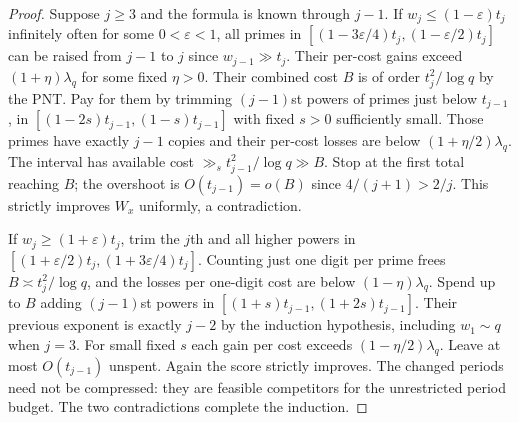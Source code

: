 \begin{proof}
Suppose $j\ge3$ and the formula is known through $j-1$. If $w_j\le(1-\varepsilon)t_j$ infinitely often for some $0<\varepsilon<1$, all primes in $[(1-3\varepsilon/4)t_j,(1-\varepsilon/2)t_j]$ can be raised from $j-1$ to $j$ since $w_{j-1}\gg t_j$. Their per-cost gains exceed $(1+\eta)\lambda_q$ for some fixed $\eta>0$. Their combined cost $B$ is of order $t_j^2/\log q$ by the PNT. Pay for them by trimming $(j-1)$st powers of primes just below $t_{j-1}$, in $[(1-2s)t_{j-1},(1-s)t_{j-1}]$ with fixed $s>0$ sufficiently small. Those primes have exactly $j-1$ copies and their per-cost losses are below $(1+\eta/2)\lambda_q$. The interval has available cost $\gg_s t_{j-1}^2/\log q\gg B$. Stop at the first total reaching $B$; the overshoot is $O(t_{j-1})=o(B)$ since $4/(j+1)>2/j$. This strictly improves $W_x$ uniformly, a contradiction.

If $w_j\ge(1+\varepsilon)t_j$, trim the $j$th and all higher powers in $[(1+\varepsilon/2)t_j,(1+3\varepsilon/4)t_j]$. Counting just one digit per prime frees $B\asymp t_j^2/\log q$, and the losses per one-digit cost are below $(1-\eta)\lambda_q$. Spend up to $B$ adding $(j-1)$st powers in $[(1+s)t_{j-1},(1+2s)t_{j-1}]$. Their previous exponent is exactly $j-2$ by the induction hypothesis, including $w_1\sim q$ when $j=3$. For small fixed $s$ each gain per cost exceeds $(1-\eta/2)\lambda_q$. Leave at most $O(t_{j-1})$ unspent. Again the score strictly improves. The changed periods need not be compressed: they are feasible competitors for the unrestricted period budget. The two contradictions complete the induction.
\end{proof}
